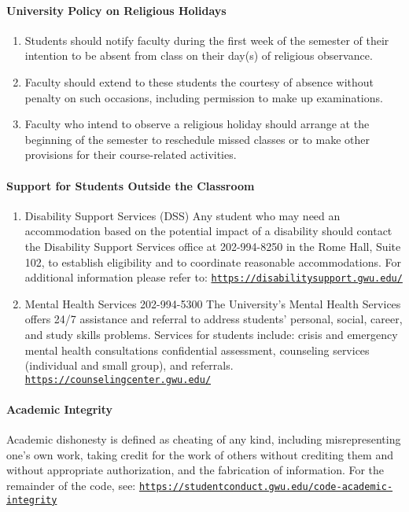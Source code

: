 \documentclass[11pt, reqno]{article}   	%
\begin{document}
\paragraph{University Policy on Religious Holidays}
\begin{enumerate}
    \item Students should notify faculty during the first week of the semester of their intention to be absent from class on their day(s) of religious observance.
    \item Faculty should extend to these students the courtesy of absence without penalty on such occasions, including permission to make up examinations.
    \item Faculty who intend to observe a religious holiday should arrange at the beginning of the semester to reschedule missed classes or to make other provisions for their course-related activities.
\end{enumerate}

\paragraph{Support for Students Outside the Classroom}
\begin{enumerate}
    \item Disability Support Services (DSS)
    Any student who may need an accommodation based on the potential impact of a disability should contact the Disability Support Services office at 202-994-8250 in the Rome Hall, Suite 102, to establish eligibility and to coordinate reasonable accommodations. 
    For additional information please refer to: \href{https://disabilitysupport.gwu.edu/}{\texttt{https://disabilitysupport.gwu.edu/}}
    \item Mental Health Services 202-994-5300
    The University's Mental Health Services offers 24/7 assistance and referral to address students' personal, social, career, and study skills problems. 
    Services for students include: crisis and emergency mental health consultations confidential assessment, counseling services (individual and small group), and referrals.
    \href{https://counselingcenter.gwu.edu/}{\texttt{https://counselingcenter.gwu.edu/}}
\end{enumerate}

\paragraph{Academic Integrity}
Academic dishonesty is defined as cheating of any kind, including misrepresenting one's own work, taking credit for the work of others without crediting them and without appropriate authorization, and the fabrication of information. 
For the remainder of the code, see: \href{https://studentconduct.gwu.edu/code-academic-integrity}{\texttt{https://studentconduct.gwu.edu/code-academic-integrity}}
\end{document}
